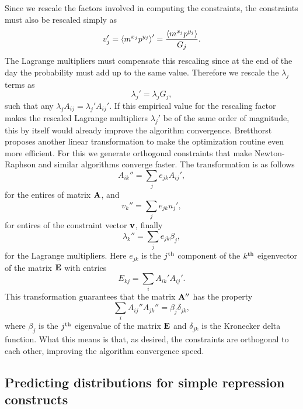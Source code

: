 Since we rescale the factors involved in computing the constraints, the
constraints must also be rescaled simply as
\begin{equation}
v_j' = \left\langle m^{x_j} p^{y_j} \right\rangle' = {\left\langle m^{x_j} p^{y_j} \right\rangle \over G_j}.
\end{equation}
The Lagrange multipliers must compensate this rescaling since at the end of the
day the probability must add up to the same value. Therefore we rescale the
$\lambda_j$ terms as
\begin{equation}
\lambda_j' = \lambda_j G_j,
\end{equation}
such that any $\lambda_j A_{ij} = \lambda_j' A_{ij}'$. If this empirical value
for the rescaling factor makes the rescaled Lagrange multipliers $\lambda_j'$
be of the same order of magnitude, this by itself would already improve the
algorithm convergence. Bretthorst proposes another linear transformation to
make the optimization routine even more efficient. For this we generate
orthogonal constraints that make Newton-Raphson and similar algorithms converge
faster. The transformation is as follows
\begin{equation}
  A_{ik}'' = \sum_j {e}_{jk} A_{ij}',
\end{equation}
for the entires of matrix $\mathbf{A}$, and
\begin{equation}
  v_k'' = \sum_j {e}_{jk} u_j',
\end{equation}
for entires of the constraint vector $\mathbf{v}$, finally
\begin{equation}
  \lambda_k'' = \sum_j {e}_{jk} \beta_j,
\end{equation}
for the Lagrange multipliers. Here ${e}_{jk}$ is the $j^\text{th}$ component
of the $k^\text{th}$ eigenvector of the matrix $\mathbf{E}$ with entries
\begin{equation}
  {E}_{kj} = \sum_i {A}_{ik}' {A}_{ij}'.
\end{equation}
This transformation guarantees that the matrix $\mathbf{A}''$ has the property
\begin{equation}
  \sum_i A_{ij}'' A_{jk}'' = \beta_j \delta_{jk},
\end{equation}
where $\beta_j$ is the $j^\text{th}$ eigenvalue of the matrix $\mathbf{E}$ and
$\delta_{jk}$ is the Kronecker delta function. What this means is that, as
desired, the constraints are orthogonal to each other, improving the algorithm
convergence speed.

\subsection{Predicting distributions for simple repression constructs}

